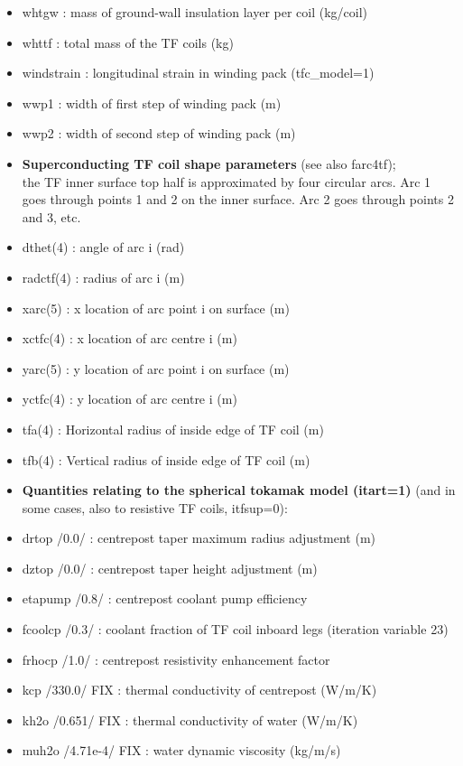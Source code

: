 \documentclass[]{article}
\begin{document}
\begin{itemize}
\item
  whtgw : mass of ground-wall insulation layer per coil (kg/coil)
\item
  whttf : total mass of the TF coils (kg)
\item
  windstrain : longitudinal strain in winding pack (tfc\_model=1)
\item
  wwp1 : width of first step of winding pack (m)
\item
  wwp2 : width of second step of winding pack (m)
\item
  \textbf{Superconducting TF coil shape parameters} (see also
  farc4tf);\\
  the TF inner surface top half is approximated by four circular arcs.
  Arc 1 goes through points 1 and 2 on the inner surface. Arc 2 goes
  through points 2 and 3, etc.
\item
  dthet(4) : angle of arc i (rad)
\item
  radctf(4) : radius of arc i (m)
\item
  xarc(5) : x location of arc point i on surface (m)
\item
  xctfc(4) : x location of arc centre i (m)
\item
  yarc(5) : y location of arc point i on surface (m)
\item
  yctfc(4) : y location of arc centre i (m)
\item
  tfa(4) : Horizontal radius of inside edge of TF coil (m)
\item
  tfb(4) : Vertical radius of inside edge of TF coil (m)
\item
  \textbf{Quantities relating to the spherical tokamak model (itart=1)}
  (and in some cases, also to resistive TF coils, itfsup=0):
\item
  drtop /0.0/ : centrepost taper maximum radius adjustment (m)
\item
  dztop /0.0/ : centrepost taper height adjustment (m)
\item
  etapump /0.8/ : centrepost coolant pump efficiency
\item
  fcoolcp /0.3/ : coolant fraction of TF coil inboard legs (iteration
  variable 23)
\item
  frhocp /1.0/ : centrepost resistivity enhancement factor
\item
  kcp /330.0/ FIX : thermal conductivity of centrepost (W/m/K)
\item
  kh2o /0.651/ FIX : thermal conductivity of water (W/m/K)
\item
  muh2o /4.71e-4/ FIX : water dynamic viscosity (kg/m/s)

\end{itemize}
\end{document}
